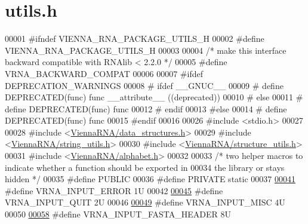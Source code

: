 \hypertarget{utils_8h_source}{}\section{utils.\+h}
\label{utils_8h_source}

\begin{DoxyCode}
00001 \textcolor{preprocessor}{#ifndef VIENNA\_RNA\_PACKAGE\_UTILS\_H}
00002 \textcolor{preprocessor}{#define VIENNA\_RNA\_PACKAGE\_UTILS\_H}
00003 
00004 \textcolor{comment}{/* make this interface backward compatible with RNAlib < 2.2.0 */}
00005 \textcolor{preprocessor}{#define VRNA\_BACKWARD\_COMPAT}
00006 
00007 \textcolor{preprocessor}{#ifdef DEPRECATION\_WARNINGS}
00008 \textcolor{preprocessor}{# ifdef \_\_GNUC\_\_}
00009 \textcolor{preprocessor}{#  define DEPRECATED(func) func \_\_attribute\_\_ ((deprecated))}
00010 \textcolor{preprocessor}{# else}
00011 \textcolor{preprocessor}{#  define DEPRECATED(func) func}
00012 \textcolor{preprocessor}{# endif}
00013 \textcolor{preprocessor}{#else}
00014 \textcolor{preprocessor}{# define DEPRECATED(func) func}
00015 \textcolor{preprocessor}{#endif}
00016 
00026 \textcolor{preprocessor}{#include <stdio.h>}
00027 
00028 \textcolor{preprocessor}{#include <\hyperlink{data__structures_8h}{ViennaRNA/data\_structures.h}>}
00029 \textcolor{preprocessor}{#include <\hyperlink{string__utils_8h}{ViennaRNA/string\_utils.h}>}
00030 \textcolor{preprocessor}{#include <\hyperlink{structure__utils_8h}{ViennaRNA/structure\_utils.h}>}
00031 \textcolor{preprocessor}{#include <\hyperlink{alphabet_8h}{ViennaRNA/alphabet.h}>}
00032 
00033 \textcolor{comment}{/* two helper macros to indicate whether a function should be exported in}
00034 \textcolor{comment}{the library or stays hidden */}
00035 \textcolor{preprocessor}{#define PUBLIC}
00036 \textcolor{preprocessor}{#define PRIVATE static}
00037 
\hypertarget{utils_8h_source.tex_l00041}{}\hyperlink{group__utils_gad403c9ea58f1836689404c2931419c8c}{00041} \textcolor{preprocessor}{#define VRNA\_INPUT\_ERROR                  1U}
00042 
\hypertarget{utils_8h_source.tex_l00045}{}\hyperlink{group__utils_ga72f3c6ca5c83d2b9baed2922d19c403d}{00045} \textcolor{preprocessor}{#define VRNA\_INPUT\_QUIT                   2U}
00046 
\hypertarget{utils_8h_source.tex_l00049}{}\hyperlink{group__utils_ga8e3241b321c9c1a78a69e59e2e019a71}{00049} \textcolor{preprocessor}{#define VRNA\_INPUT\_MISC                   4U}
00050 
\hypertarget{utils_8h_source.tex_l00058}{}\hyperlink{group__utils_ga2f0d8069e93d3ac54d9320d6bdb8e7e7}{00058} \textcolor{preprocessor}{#define VRNA\_INPUT\_FASTA\_HEADER           8U}

\end{DoxyCode}
